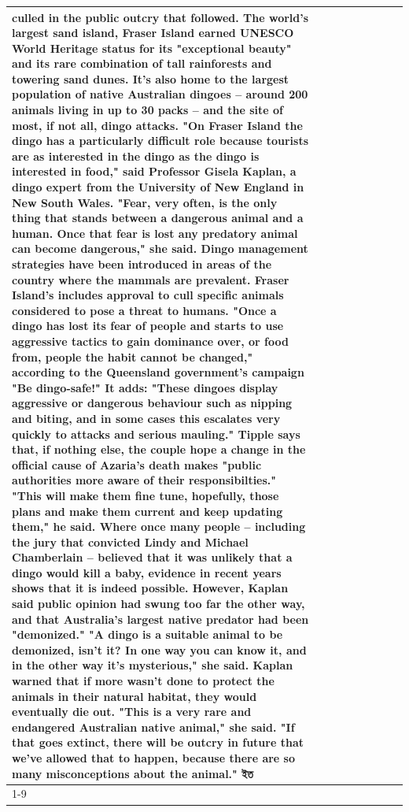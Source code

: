 \begin{table}[H]
\begin{tabular}{lllrlllll}
culled in the public outcry that followed. The world's largest sand island, Fraser Island earned UNESCO World Heritage status for its "exceptional beauty" and its rare combination of tall rainforests and towering sand dunes. It's also home to the largest population of native Australian dingoes -- around 200 animals living in up to 30 packs -- and the site of most, if not all, dingo attacks. "On Fraser Island the dingo has a particularly difficult role because tourists are as interested in the dingo as the dingo is interested in food," said Professor Gisela Kaplan, a dingo expert from the University of New England in New South Wales. "Fear, very often, is the only thing that stands between a dangerous animal and a human. Once that fear is lost any predatory animal can become dangerous," she said. Dingo management strategies have been introduced in areas of the country where the mammals are prevalent. Fraser Island's includes approval to cull specific animals considered to pose a threat to humans. "Once a dingo has lost its fear of people and starts to use aggressive tactics to gain dominance over, or food from, people the habit cannot be changed," according to the Queensland government's campaign "Be dingo-safe!" It adds: "These dingoes display aggressive or dangerous behaviour such as nipping and biting, and in some cases this escalates very quickly to attacks and serious mauling." Tipple says that, if nothing else, the couple hope a change in the official cause of Azaria's death makes "public authorities more aware of their responsibilties." "This will make them fine tune, hopefully, those plans and make them current and keep updating them," he said. Where once many people -- including the jury that convicted Lindy and Michael Chamberlain -- believed that it was unlikely that a dingo would kill a baby, evidence in recent years shows that it is indeed possible. However, Kaplan said public opinion had swung too far the other way, and that Australia's largest native predator had been "demonized." "A dingo is a suitable animal to be demonized, isn't it? In one way you can know it, and in the other way it's mysterious," she said. Kaplan warned that if more wasn't done to protect the animals in their natural habitat, they would eventually die out. "This is a very rare and endangered Australian native animal," she said. "If that goes extinct, there will be outcry in future that we've allowed that to happen, because there are so many misconceptions about the animal." ইত \\
\cline{1-9}

\end{tabular}
\end{table}
